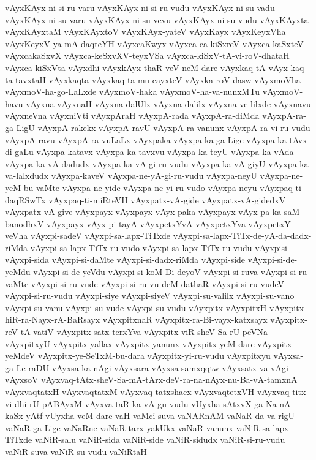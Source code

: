 {vAyxKAyx-ni-si-ru-varu
vAyxKAyx-ni-si-ru-vudu
vAyxKAyx-ni-su-vadu
vAyxKAyx-ni-su-varu
vAyxKAyx-ni-su-vevu
vAyxKAyx-ni-su-vudu
vAyxKAyxta
vAyxKAyxtaM
vAyxKAyxtoV
vAyxKAyx-yateV
vAyxKayx
vAyxKeyxVha
vAyxKeyxV-ya-mA-daqteYH
vAyxcaKwyx
vAyxca-ca-kiSxreV
vAyxca-kaSxteV
vAyxcakaSxvX
vAyxca-keSxvXV-teyxVSa
vAyxca-kiSxV-tA-vi-roV-dhataH
vAyxca-kiSxVta
vAyxdhi
vAyxkAyx-thaR-veV-neM-dare
vAyxkaq-tA-vAyx-kaq-ta-tavxtaH
vAyxkaqta
vAyxkaq-ta-mu-cayxteV
vAyxka-roV-dasw
vAyxmoVha
vAyxmoV-ha-go-LaLxde
vAyxmoV-haka
vAyxmoV-ha-va-nunxMTu
vAyxmoV-havu
vAyxna
vAyxnaH
vAyxna-dalUlx
vAyxna-dalilx
vAyxna-ve-lilxde
vAyxnavu
vAyxneVna
vAyxniVti
vAyxpAraH
vAyxpA-rada
vAyxpA-ra-diMda
vAyxpA-ra-ga-LigU
vAyxpA-rakekx
vAyxpA-ravU
vAyxpA-ra-vanunx
vAyxpA-ra-vi-ru-vudu
vAyxpA-ravu
vAyxpA-ra-vuLaLx
vAyxpaka
vAyxpa-ka-ga-Lige
vAyxpa-ka-tAvx-di-gaLu
vAyxpa-katavx
vAyxpa-ka-tavxvu
vAyxpa-ka-teyU
vAyxpa-ka-vAda
vAyxpa-ka-vA-dadudx
vAyxpa-ka-vA-gi-ru-vudu
vAyxpa-ka-vA-giyU
vAyxpa-ka-va-lalxdudx
vAyxpa-kaveV
vAyxpa-ne-yA-gi-ru-vudu
vAyxpa-neyU
vAyxpa-ne-yeM-bu-vaMte
vAyxpa-ne-yide
vAyxpa-ne-yi-ru-vudo
vAyxpa-neyu
vAyxpaq-ti-daqRSwTx
vAyxpaq-ti-miRteVH
vAyxpatx-vA-gide
vAyxpatx-vA-gidedxV
vAyxpatx-vA-give
vAyxpayx
vAyxpayx-vAyx-paka
vAyxpayx-vAyx-pa-ka-saM-banodhxV
vAyxpayx-vAyx-pi-tayA
vAyxpetxYvA
vAyxpetxYva
vAyxpetxY-veVha
vAyxpi-sadeV
vAyxpi-sa-lapx-TiTxde
vAyxpi-sa-lapx-TiTx-de-yA-da-dadx-riMda
vAyxpi-sa-lapx-TiTx-ru-vudo
vAyxpi-sa-lapx-TiTx-ru-vudu
vAyxpisi
vAyxpi-sida
vAyxpi-si-daMte
vAyxpi-si-dadx-riMda
vAyxpi-side
vAyxpi-si-de-yeMdu
vAyxpi-si-de-yeVdu
vAyxpi-si-koM-Di-deyoV
vAyxpi-si-ruva
vAyxpi-si-ru-vaMte
vAyxpi-si-ru-vude
vAyxpi-si-ru-vu-deM-dathaR
vAyxpi-si-ru-vudeV
vAyxpi-si-ru-vudu
vAyxpi-siye
vAyxpi-siyeV
vAyxpi-su-valilx
vAyxpi-su-vano
vAyxpi-su-vanu
vAyxpi-su-vude
vAyxpi-su-vudu
vAyxpitx
vAyxpitxH
vAyxpitx-hiR-ra-Nayx-rA-BaRsayx
vAyxpitxnaR
vAyxpitx-ra-Bi-vayx-katxsayx
vAyxpitx-reV-tA-vatiV
vAyxpitx-satx-terxYva
vAyxpitx-viR-sheV-Sa-rU-peVNa
vAyxpitxyU
vAyxpitx-yallax
vAyxpitx-yanunx
vAyxpitx-yeM-dare
vAyxpitx-yeMdeV
vAyxpitx-ye-SeTxM-bu-dara
vAyxpitx-yi-ru-vudu
vAyxpitxyu
vAyxsa-ga-Le-raDU
vAyxsa-ka-nAgi
vAyxsara
vAyxsa-samxqqtw
vAyxsatx-va-vAgi
vAyxsoV
vAyxvaq-tAtx-sheV-Sa-mA-tArx-deV-ra-na-nAyx-nu-Ba-vA-tamxnA
vAyxvaqtatxH
vAyxvaqtatxM
vAyxvaq-tatxshacx
vAyxvaqtetxVH
vAyxvaq-titx-vi-dhi-rU-pABAyxM
vAyxva-taR-ka-vA-gu-vudu
vUyxha-sAtxvX-ga-Na-nA-kaSx-yAtf
vUyxha-veM-dare
vaH
vaMci-suva
vaNARnAM
vaNaR-da-va-rigU
vaNaR-ga-Lige
vaNaRne
vaNaR-tarx-yakUkx
vaNaR-vanunx
vaNiR-sa-lapx-TiTxde
vaNiR-salu
vaNiR-sida
vaNiR-side
vaNiR-sidudx
vaNiR-si-ru-vudu
vaNiR-suva
vaNiR-su-vudu
vaNiRtaH
}
